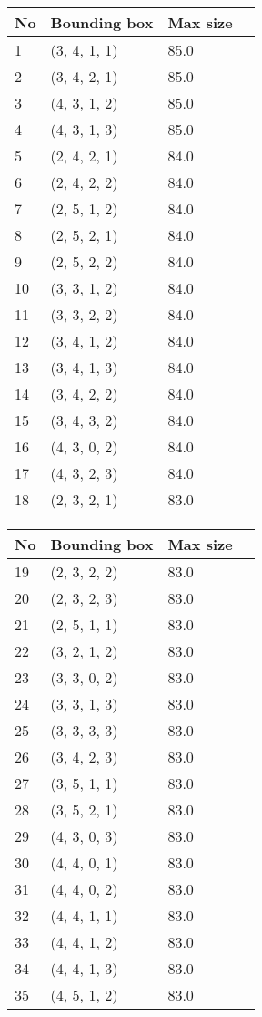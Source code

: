 %
    \begin{tabular}{|l|l|l|l|}
    \hline
    No &  Bounding box &  Max size  \\
    \hline%
    
1&(3, 4, 1, 1)& 85.0\\
2&(3, 4, 2, 1)& 85.0\\
3&(4, 3, 1, 2)& 85.0\\
4&(4, 3, 1, 3)& 85.0\\
5&(2, 4, 2, 1)& 84.0\\
6&(2, 4, 2, 2)& 84.0\\
7&(2, 5, 1, 2)& 84.0\\
8&(2, 5, 2, 1)& 84.0\\
9&(2, 5, 2, 2)& 84.0\\
10&(3, 3, 1, 2)& 84.0\\
11&(3, 3, 2, 2)& 84.0\\
12&(3, 4, 1, 2)& 84.0\\
13&(3, 4, 1, 3)& 84.0\\
14&(3, 4, 2, 2)& 84.0\\
15&(3, 4, 3, 2)& 84.0\\
16&(4, 3, 0, 2)& 84.0\\
17&(4, 3, 2, 3)& 84.0\\
18&(2, 3, 2, 1)& 83.0\\
%
    \hline
    \end{tabular}%
\hspace*{5mm}
%
    \begin{tabular}{|l|l|l|l|}
    \hline
    No &  Bounding box &  Max size  \\
    \hline%
    
19&(2, 3, 2, 2)& 83.0\\
20&(2, 3, 2, 3)& 83.0\\
21&(2, 5, 1, 1)& 83.0\\
22&(3, 2, 1, 2)& 83.0\\
23&(3, 3, 0, 2)& 83.0\\
24&(3, 3, 1, 3)& 83.0\\
25&(3, 3, 3, 3)& 83.0\\
26&(3, 4, 2, 3)& 83.0\\
27&(3, 5, 1, 1)& 83.0\\
28&(3, 5, 2, 1)& 83.0\\
29&(4, 3, 0, 3)& 83.0\\
30&(4, 4, 0, 1)& 83.0\\
31&(4, 4, 0, 2)& 83.0\\
32&(4, 4, 1, 1)& 83.0\\
33&(4, 4, 1, 2)& 83.0\\
34&(4, 4, 1, 3)& 83.0\\
35&(4, 5, 1, 2)& 83.0\\
%
    \hline
    \end{tabular}%
